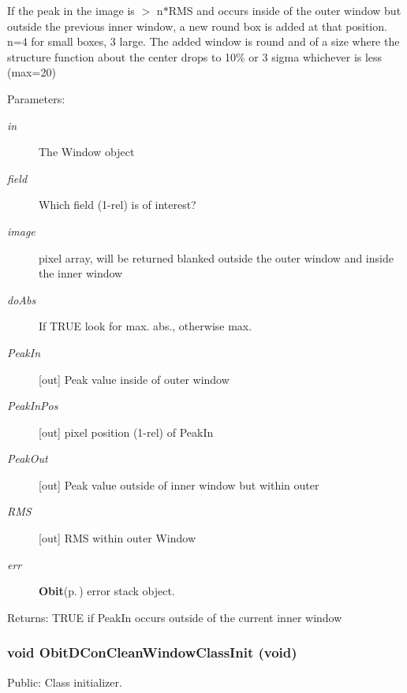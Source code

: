 If the peak in the image is $>$ n$\ast$RMS and occurs inside of the outer window but outside the previous inner window, a new round box is added at that position. n=4 for small boxes, 3 large. The added window is round and of a size where the structure function about the center drops to 10\% or 3 sigma whichever is less (max=20) \begin{Desc}
\item[Parameters:]
\begin{description}
\item[{\em in}]The Window object \item[{\em field}]Which field (1-rel) is of interest? \item[{\em image}]pixel array, will be returned blanked outside the outer window and inside the inner window \item[{\em do\-Abs}]If TRUE look for max. abs., otherwise max. \item[{\em Peak\-In}][out] Peak value inside of outer window \item[{\em Peak\-In\-Pos}][out] pixel position (1-rel) of Peak\-In \item[{\em Peak\-Out}][out] Peak value outside of inner window but within outer\item[{\em RMS}][out] RMS within outer Window \item[{\em err}]{\bf Obit}{\rm (p.\,\pageref{structObit})} error stack object. \end{description}
\end{Desc}
\begin{Desc}
\item[Returns:]TRUE if Peak\-In occurs outside of the current inner window \end{Desc}
\subsubsection{\setlength{\rightskip}{0pt plus 5cm}void Obit\-DCon\-Clean\-Window\-Class\-Init (void)}\label{ObitDConCleanWindow_8h_a25}


Public: Class initializer. 

